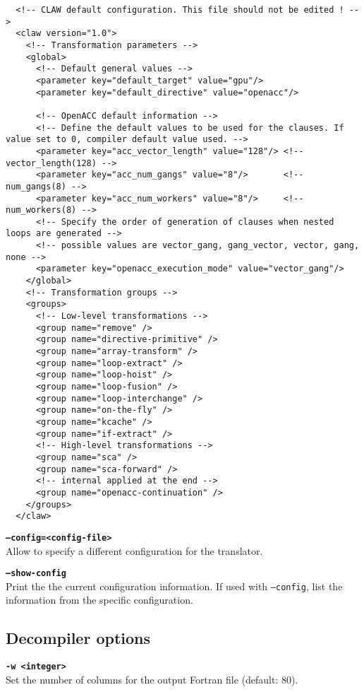 \documentclass{article}
\begin{document}
\begin{lstlisting}
  <!-- CLAW default configuration. This file should not be edited ! -->
  <claw version="1.0">
    <!-- Transformation parameters -->
    <global>
      <!-- Default general values -->
      <parameter key="default_target" value="gpu"/>
      <parameter key="default_directive" value="openacc"/>

      <!-- OpenACC default information -->
      <!-- Define the default values to be used for the clauses. If value set to 0, compiler default value used. -->
      <parameter key="acc_vector_length" value="128"/> <!-- vector_length(128) -->
      <parameter key="acc_num_gangs" value="8"/>       <!-- num_gangs(8) -->
      <parameter key="acc_num_workers" value="8"/>     <!-- num_workers(8) -->
      <!-- Specify the order of generation of clauses when nested loops are generated -->
      <!-- possible values are vector_gang, gang_vector, vector, gang, none -->
      <parameter key="openacc_execution_mode" value="vector_gang"/>
    </global>
    <!-- Transformation groups -->
    <groups>
      <!-- Low-level transformations -->
      <group name="remove" />
      <group name="directive-primitive" />
      <group name="array-transform" />
      <group name="loop-extract" />
      <group name="loop-hoist" />
      <group name="loop-fusion" />
      <group name="loop-interchange" />
      <group name="on-the-fly" />
      <group name="kcache" />
      <group name="if-extract" />
      <!-- High-level transformations -->
      <group name="sca" />
      <group name="sca-forward" />
      <!-- internal applied at the end -->
      <group name="openacc-continuation" />
    </groups>
  </claw>
\end{lstlisting}

\textbf{\texttt{--config=<config-file>}}\\
Allow to specify a different configuration for the translator.

\textbf{\texttt{--show-config}}\\
Print the the current configuration information. If used with \texttt{--config}, list the information from the specific configuration.

\subsection{Decompiler options}
\textbf{\texttt{-w <integer>}}\\
Set the number of columns for the output Fortran file (default: 80).
\end{document}
